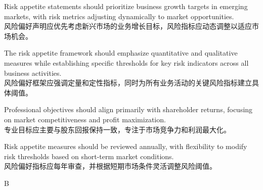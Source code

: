 \documentclass{article}
\begin{document}
\begin{choices}
    \item Risk appetite statements should prioritize business growth targets in emerging markets, with risk metrics adjusting dynamically to market opportunities.\\
    风险偏好声明应优先考虑新兴市场的业务增长目标，风险指标应动态调整以适应市场机会。
    
    \item The risk appetite framework should emphasize quantitative and qualitative measures while establishing specific thresholds for key risk indicators across all business activities.\\
    风险偏好框架应强调定量和定性指标，同时为所有业务活动的关键风险指标建立具体阈值。
    
    \item Professional objectives should align primarily with shareholder returns, focusing on market competitiveness and profit maximization.\\
    专业目标应主要与股东回报保持一致，专注于市场竞争力和利润最大化。
    
    \item Risk appetite measures should be reviewed annually, with flexibility to modify risk thresholds based on short-term market conditions.\\
    风险偏好指标应每年审查，并根据短期市场条件灵活调整风险阈值。
\end{choices}

\begin{correctanswer}
   B
\end{correctanswer}
\end{document}
